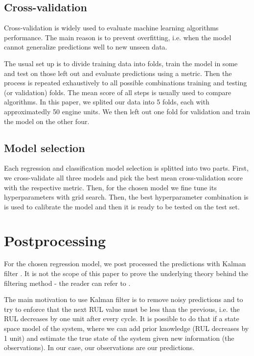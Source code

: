 \documentclass[letterpaper, 10 pt, conference, onecolumn]{ieeeconf}  %
\begin{document}

\subsection{Cross-validation}
Cross-validation is widely used to evaluate machine learning algorithms performance. The main reason is to prevent overfitting, i.e. when the model cannot generalize predictions well to new unseen data.

The usual set up is to divide training data into folds, train the model in some and test on those left out and evaluate predictions using a metric. Then the process is repeated exhaustively to all possible combinations training and testing (or validation) folds. The mean score of all steps is usually used to compare algorithms. In this paper, we splited our data into 5 folds, each with approximatedly 50 engine units. We then left out one fold for validation and train the model on the other four.



\subsection{Model selection}
Each regression and classification model selection is splitted into two parts. First, we cross-validate all three models and pick the best mean cross-validation score with the respective metric. Then, for the chosen model we fine tune its hyperparameters with grid search. Then, the best hyperparameter combination is is used to calibrate the model and then it is ready to be tested on the test set.


\section{Postprocessing}\label{sec:postprocess}
For the chosen regression model, we post processed the predictions with Kalman filter \cite{h2oai}. It is not the scope of this paper to prove the underlying theory behind the filtering method - the reader can refer to \cite{kalman1960new}. 

The main motivation to use Kalman filter is to remove noisy predictions and to try to enforce that the next RUL value must be less than the previous, i.e. the RUL decreases by one unit after every cycle. It is possible to do that if a state space model of the system, where we can add prior knowledge (RUL decreases by 1 unit) and estimate the true state of the system given new information (the observations). In our case, our observations are our predictions.
\end{document}
